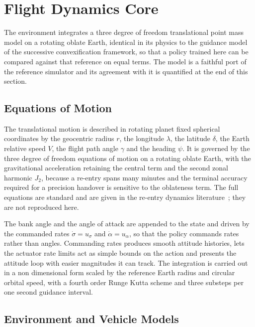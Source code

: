 \documentclass[11pt]{article}
\begin{document}
\section{Flight Dynamics Core}
\label{sec:fd}

The environment integrates a three degree of freedom translational point mass model on a rotating oblate Earth, identical in its physics to the guidance model of the successive convexification framework, so that a policy trained here can be compared against that reference on equal terms. The model is a faithful port of the reference simulator and its agreement with it is quantified at the end of this section.

\subsection{Equations of Motion}

The translational motion is described in rotating planet fixed spherical coordinates by the geocentric radius $r$, the longitude $\lambda$, the latitude $\delta$, the Earth relative speed $V$, the flight path angle $\gamma$ and the heading $\psi$. It is governed by the three degree of freedom equations of motion on a rotating oblate Earth, with the gravitational acceleration retaining the central term and the second zonal harmonic $J_2$, because a re-entry spans many minutes and the terminal accuracy required for a precision handover is sensitive to the oblateness term. The full equations are standard and are given in the re-entry dynamics literature~\cite{mooij1994motion,mooij2024reentrysystems,dominguez2021abort}; they are not reproduced here.

The bank angle and the angle of attack are appended to the state and driven by the commanded rates $\dot\sigma=u_\sigma$ and $\dot\alpha=u_\alpha$, so that the policy commands rates rather than angles. Commanding rates produces smooth attitude histories, lets the actuator rate limits act as simple bounds on the action and presents the attitude loop with easier magnitudes it can track. The integration is carried out in a non dimensional form scaled by the reference Earth radius and circular orbital speed, with a fourth order Runge Kutta scheme and three substeps per one second guidance interval.

\subsection{Environment and Vehicle Models}
\end{document}
